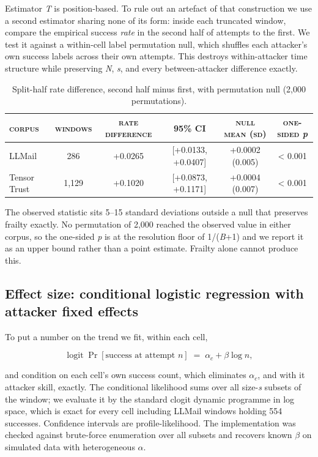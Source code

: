 \documentclass[conference]{IEEEtran}
\begin{document}
Estimator \textit{T} is position-based. To rule out an artefact of that construction we use a second estimator sharing none of its form: inside each truncated window, compare the empirical success \textit{rate} in the second half of attempts to the first. We test it against a within-cell label permutation null, which shuffles each attacker's own success labels across their own attempts. This destroys within-attacker time structure while preserving \textit{N}, \textit{s}, and every between-attacker difference exactly.

\begin{table}[t]
\centering
\caption{Split-half rate difference, second half minus first, with permutation null (2,000 permutations).}
\label{tab:2}
\small
\begin{tabular}{lccccc}
\toprule
\textsc{corpus} & \textsc{windows} & \textsc{rate difference} & \textsc{95\% CI} & \textsc{null mean (sd)} & \textsc{one-sided }\textit{p} \\
\midrule
LLMail & 286 & +0.0265 & [+0.0133, +0.0407] & +0.0002 (0.005) & \textless{} 0.001 \\
Tensor Trust & 1,129 & +0.1020 & [+0.0873, +0.1171] & +0.0004 (0.007) & \textless{} 0.001 \\
\bottomrule
\end{tabular}
\end{table}


The observed statistic sits 5--15 standard deviations outside a null that preserves frailty exactly. No permutation of 2,000 reached the observed value in either corpus, so the one-sided \textit{p} is at the resolution floor of 1/(\textit{B}+1) and we report it as an upper bound rather than a point estimate. Frailty alone cannot produce this.


\subsection{Effect size: conditional logistic regression with attacker fixed effects}

To put a number on the trend we fit, within each cell,

\begin{equation*}
\operatorname{logit} \Pr\!\left[\text{success at attempt } n\right] \;=\; \alpha_c + \beta \log n,
\end{equation*}

and condition on each cell's own success count, which eliminates $\alpha_{c}$, and with it attacker skill, exactly. The conditional likelihood sums over all size-\textit{s} subsets of the window; we evaluate it by the standard clogit dynamic programme in log space, which is exact for every cell including LLMail windows holding 554 successes. Confidence intervals are profile-likelihood. The implementation was checked against brute-force enumeration over all subsets and recovers known $\beta$ on simulated data with heterogeneous $\alpha$.
\end{document}

